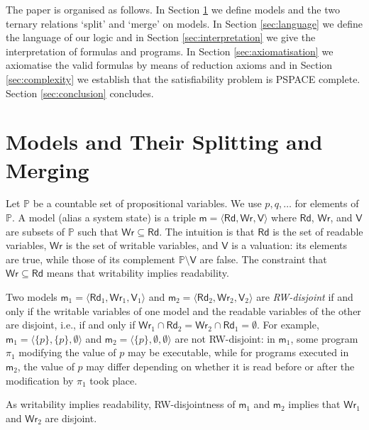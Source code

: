 \documentclass{llncs}
\newcommand{\atmset}{\mathtt{\mathbb X}}	%
\newcommand{\modl}{\mathsf m}
\newcommand{\readable}[1]{\mathtt{r}_{#1}}
\newcommand{\readset}{\mathsf{Rd}}
\newcommand{\valuset}{\mathsf{V}}
\newcommand{\writable}[1]{\mathtt{w}_{#1}}
\newcommand{\writeset}{\mathsf{Wr}}
\newcommand{\propset}{\mathbb P}
\newcommand{\set}[1]{\{#1\}}
\newcommand{\tuple}[1]{ \langle #1 \rangle}
\begin{document}
The paper is organised as follows.
In Section \ref{sec:models} we define models and the two ternary relations `split' and `merge' on models. 
In Section \ref{sec:language} we define the language of our logic and 
in Section \ref{sec:interpretation} we give the interpretation of formulas and programs. 
In Section \ref{sec:axiomatisation} we axiomatise the valid formulas by means of reduction axioms and
in Section \ref{sec:complexity} we establish that the satisfiability problem is PSPACE complete. 
Section \ref{sec:conclusion} concludes. 


\section{Models and Their Splitting and Merging }\label{sec:models} 

Let $\propset$ be a countable set of propositional variables. 
We use $p, q,\ldots$ for elements of $\propset$. 
A model (alias a system state) is a %
triple $\modl = \tuple{\readset,\writeset,\valuset}$ 
where $\readset$, $\writeset$, and $\valuset$ are subsets of $\propset$ such that $\writeset \subseteq \readset$. 
The intuition is that $\readset$ is the set of readable variables, $\writeset$ is the set of writable variables, and $\valuset$ is a valuation: 
its elements are true, while those of its complement $\propset \setminus \valuset$ are false. 
The constraint that $\writeset \subseteq \readset$ means that writability implies readability. 

Two models 
$\modl_1 = \tuple{\readset_1,\writeset_1,\valuset_1}$ and 
$\modl_2 = \tuple{\readset_2,\writeset_2,\valuset_2}$ are \emph{RW-disjoint} 
if and only if the writable variables of one model and the readable variables of the other are disjoint, i.e., 
if and only if $\writeset_1 \cap \readset_2  = \writeset_2 \cap \readset_1  = \emptyset $. 
For example, 
$\modl_1 = \tuple{ \set p , \set p , \emptyset}$ and 
$\modl_2 = \tuple{ \set p , \emptyset , \emptyset}$ are not RW-disjoint:
in $\modl_1$, some program $\pi_1$ modifying the value of $p$ may be executable, while 
for programs executed in $\modl_2$, the value of $p$ %
may differ depending on whether it is read 
before or after the modification by $\pi_1$ took place. 

As writability implies readability, %
RW-disjointness of $\modl_1$ and $\modl_2$ implies that
$\writeset_1$ and $\writeset_2$ are disjoint. 
\end{document}
